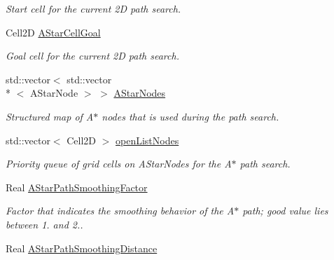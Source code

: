 \begin{DoxyCompactItemize}
\begin{DoxyCompactList}\small\item\em Start cell for the current 2\-D path search. \end{DoxyCompactList}\item 
\hypertarget{classSquirrelMotionPlanner_1_1Planner_a494391751e3e9002c1f633d448a2a656}{Cell2\-D \hyperlink{classSquirrelMotionPlanner_1_1Planner_a494391751e3e9002c1f633d448a2a656}{A\-Star\-Cell\-Goal}}\label{classSquirrelMotionPlanner_1_1Planner_a494391751e3e9002c1f633d448a2a656}

\begin{DoxyCompactList}\small\item\em Goal cell for the current 2\-D path search. \end{DoxyCompactList}\item 
\hypertarget{classSquirrelMotionPlanner_1_1Planner_abebc97ea1ae51a31a8724955aea75bf1}{std\-::vector$<$ std\-::vector\\*
$<$ A\-Star\-Node $>$ $>$ \hyperlink{classSquirrelMotionPlanner_1_1Planner_abebc97ea1ae51a31a8724955aea75bf1}{A\-Star\-Nodes}}\label{classSquirrelMotionPlanner_1_1Planner_abebc97ea1ae51a31a8724955aea75bf1}

\begin{DoxyCompactList}\small\item\em Structured map of A$\ast$ nodes that is used during the path search. \end{DoxyCompactList}\item 
\hypertarget{classSquirrelMotionPlanner_1_1Planner_ae9771d5b68969a7c62116e63e3dae3ea}{std\-::vector$<$ Cell2\-D $>$ \hyperlink{classSquirrelMotionPlanner_1_1Planner_ae9771d5b68969a7c62116e63e3dae3ea}{open\-List\-Nodes}}\label{classSquirrelMotionPlanner_1_1Planner_ae9771d5b68969a7c62116e63e3dae3ea}

\begin{DoxyCompactList}\small\item\em Priority queue of grid cells on A\-Star\-Nodes for the A$\ast$ path search. \end{DoxyCompactList}\item 
\hypertarget{classSquirrelMotionPlanner_1_1Planner_acaec47eaa6b7ea907e3c5462d3862041}{Real \hyperlink{classSquirrelMotionPlanner_1_1Planner_acaec47eaa6b7ea907e3c5462d3862041}{A\-Star\-Path\-Smoothing\-Factor}}\label{classSquirrelMotionPlanner_1_1Planner_acaec47eaa6b7ea907e3c5462d3862041}

\begin{DoxyCompactList}\small\item\em Factor that indicates the smoothing behavior of the A$\ast$ path; good value lies between 1. and 2.. \end{DoxyCompactList}\item 
\hypertarget{classSquirrelMotionPlanner_1_1Planner_ad6118dc6c8464d298a8deb7276d2857a}{Real \hyperlink{classSquirrelMotionPlanner_1_1Planner_ad6118dc6c8464d298a8deb7276d2857a}{A\-Star\-Path\-Smoothing\-Distance}}\label{classSquirrelMotionPlanner_1_1Planner_ad6118dc6c8464d298a8deb7276d2857a}


\end{DoxyCompactItemize}
